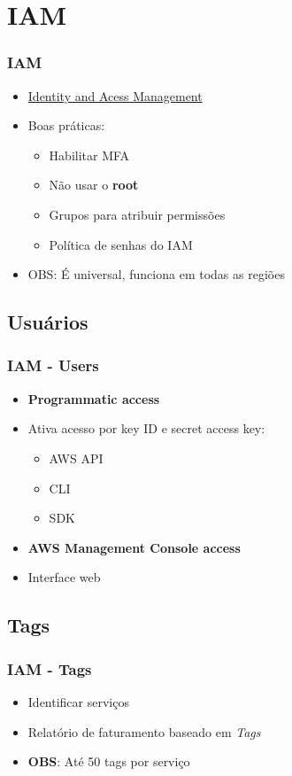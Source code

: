 \section{IAM}

\begin{frame}
	\frametitle{IAM}
	\begin{itemize}
		\item \href{https://docs.aws.amazon.com/wellarchitected/latest/security-pillar/identity-and-access-management.html}{Identity and Acess Management}
		\item Boas práticas:
			\begin{itemize}
				\item Habilitar MFA
				\item Não usar o \textbf{root}
				\item Grupos para atribuir permissões
				\item Política de senhas do IAM
			\end{itemize}
		\item OBS: É universal, funciona em todas as regiões
	\end{itemize}
\end{frame}

\subsection{Usuários}

\begin{frame}
	\frametitle{IAM - Users}
	\begin{itemize}
		\item \textbf{Programmatic access}
		\item Ativa acesso por key ID e secret access key:
			\begin{itemize}
				\item AWS API
				\item CLI
				\item SDK
			\end{itemize}
		\item \textbf{AWS Management Console access}
		\item Interface web
	\end{itemize}
\end{frame}

\subsection{Tags}

\begin{frame}
	\frametitle{IAM - Tags}
	\begin{itemize}
		\item Identificar serviços
		\item Relatório de faturamento baseado em \textit{Tags}
		\item \textbf{OBS}: Até 50 tags por serviço
	\end{itemize}
\end{frame}

